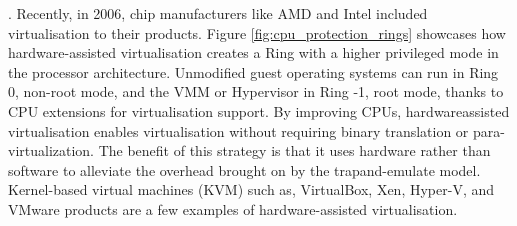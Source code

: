 \cite{citation_1}. Recently, in 2006, chip manufacturers like AMD and
Intel included virtualisation to their products. Figure \ref{fig:cpu_protection_rings}
showcases how hardware-assisted virtualisation creates a
Ring with a higher privileged mode in the processor
architecture. Unmodified guest operating systems can run
in Ring 0, non-root mode, and the VMM or Hypervisor in
Ring -1, root mode, thanks to CPU extensions for
virtualisation support. By improving CPUs, hardwareassisted virtualisation enables virtualisation without
requiring binary translation or para-virtualization. The
benefit of this strategy is that it uses hardware rather than
software to alleviate the overhead brought on by the trapand-emulate model. Kernel-based virtual machines
(KVM) such as, VirtualBox, Xen, Hyper-V, and VMware
products are a few examples of hardware-assisted
virtualisation.